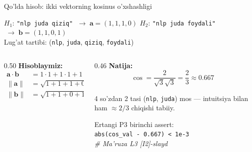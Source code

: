 \documentclass[aspectratio=169,11pt]{beamer}
\begin{document}
%
\begin{frame}{Qo'lda hisob: ikki vektorning kosinus o'xshashligi}
  \begin{tcolorbox}[defbox,title=Kichik korpus (BoW vektorlari)]
    \small
    $H_1$: \texttt{"nlp juda qiziq"} $\;\to\; \mathbf{a}=(1,1,1,0)$\quad
    $H_2$: \texttt{"nlp juda foydali"} $\;\to\; \mathbf{b}=(1,1,0,1)$\\[2pt]
    {\scriptsize\color{halfgray}Lug'at tartibi:
    (\texttt{nlp}, \texttt{juda}, \texttt{qiziq}, \texttt{foydali})}
  \end{tcolorbox}
  \vspace{0.2em}
  \begin{columns}[T]
    \begin{column}{0.50\textwidth}
      \textbf{Hisoblaymiz:}
      \begin{align*}
        \mathbf{a}\cdot\mathbf{b} &= 1{\cdot}1 + 1{\cdot}1 + 1{\cdot}0 + 0{\cdot}1 = 2\\
        \lVert\mathbf{a}\rVert &= \sqrt{1+1+1+0} = \sqrt{3}\\
        \lVert\mathbf{b}\rVert &= \sqrt{1+1+0+1} = \sqrt{3}
      \end{align*}
    \end{column}
    \begin{column}{0.46\textwidth}
      \textbf{Natija:}
      $$\cos = \frac{2}{\sqrt{3}\sqrt{3}} = \frac{2}{3} \approx \mathbf{0.667}$$
      \begin{tcolorbox}[okbox,top=2pt,bottom=2pt]
        \footnotesize 4 so'zdan 2 tasi (\texttt{nlp}, \texttt{juda})
        mos --- intuitsiya bilan ham $\approx 2/3$ chiqishi tabiiy.
      \end{tcolorbox}
      \vspace{3pt}
      \footnotesize\color{halfgray}
      Ertangi P3 birinchi assert:\\
      \texttt{abs(cos\_val - 0.667) < 1e-3}\\
      \textit{\# Ma'ruza L3 [I2]-slayd}
    \end{column}
  \end{columns}
\end{frame}
\end{document}
